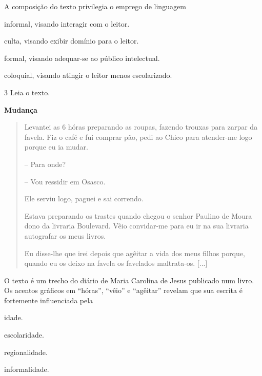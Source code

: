 A composição do texto privilegia o emprego de linguagem

\begin{escolha}
\item informal, visando interagir com o leitor.

\item culta, visando exibir domínio para o leitor.

\item formal, visando adequar-se ao público intelectual.

\item coloquial, visando atingir o leitor menos escolarizado.
\end{escolha}

\num{3} Leia o texto.

\centering\textbf{Mudança}


\begin{quote}
Levantei as 6 hóras preparando as roupas, fazendo trouxas para zarpar da
favela. Fiz o café e fui comprar pão, pedi ao Chico para atender-me logo
porque eu ia mudar.

-- Para onde?

-- Vou ressidir em Osasco.

Ele serviu logo, paguei e sai correndo.

Estava preparando os trastes quando chegou o senhor Paulino de Moura
dono da livraria Boulevard. Vêio convidar-me para eu ir na sua livraria
autografar os meus livros.

Eu disse-lhe que irei depois que agêitar a vida dos meus filhos porque,
quando eu os deixo na favela os favelados maltrata-os. {[}...{]}
\end{quote}

O texto é um trecho do diário de Maria Carolina de Jesus publicado num
livro. Os acentos gráficos em ``hóras'', ``vêio'' e ``agêitar'' revelam
que sua escrita é fortemente influenciada pela

\begin{escolha}
\item idade.

\item escolaridade.

\item regionalidade.

\item informalidade.
\end{escolha}